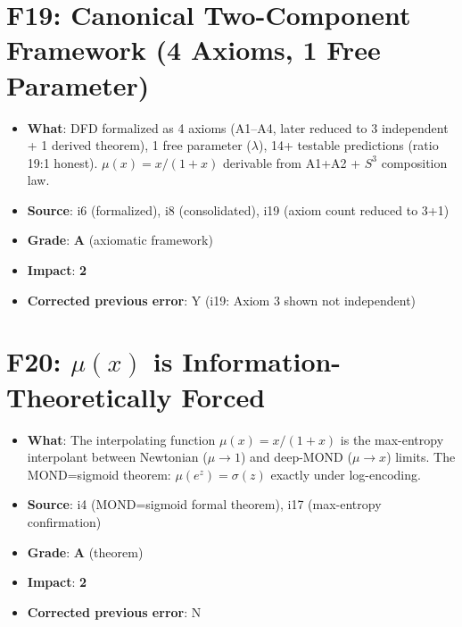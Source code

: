 \documentclass[11pt,a4paper]{article}
\newcommand{\grade}[1]{\textbf{#1}}
\newcommand{\impact}[1]{\textbf{#1}}
\begin{document}
\section{F19: Canonical Two-Component Framework (4 Axioms, 1 Free Parameter)}
\begin{itemize}[nosep]
\item \textbf{What}: DFD formalized as 4 axioms (A1--A4, later reduced to 3 independent + 1 derived theorem), 1 free parameter ($\lambda$), 14+ testable predictions (ratio 19:1 honest). $\mu(x) = x/(1+x)$ derivable from A1+A2 + $S^3$ composition law.
\item \textbf{Source}: i6 (formalized), i8 (consolidated), i19 (axiom count reduced to 3+1)
\item \textbf{Grade}: \grade{A} (axiomatic framework)
\item \textbf{Impact}: \impact{2}
\item \textbf{Corrected previous error}: Y (i19: Axiom 3 shown not independent)
\end{itemize}

\section{F20: $\mu(x)$ is Information-Theoretically Forced}
\begin{itemize}[nosep]
\item \textbf{What}: The interpolating function $\mu(x) = x/(1+x)$ is the max-entropy interpolant between Newtonian ($\mu \to 1$) and deep-MOND ($\mu \to x$) limits. The MOND=sigmoid theorem: $\mu(e^z) = \sigma(z)$ exactly under log-encoding.
\item \textbf{Source}: i4 (MOND=sigmoid formal theorem), i17 (max-entropy confirmation)
\item \textbf{Grade}: \grade{A} (theorem)
\item \textbf{Impact}: \impact{2}
\item \textbf{Corrected previous error}: N
\end{itemize}

\end{document}
